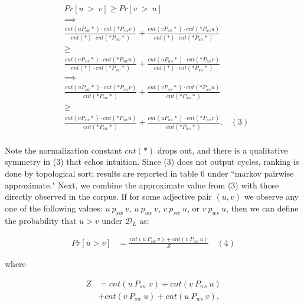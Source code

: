 \documentclass[11pt,letterpaper]{article}
\begin{document}
\begin{align*}
  &Pr[u \: > \: v] \ge Pr[v \: > \: u] \\
  &\implies \\
  &\frac{ cnt(u P_{sw} *) \cdot cnt(* P_{sw} v) }{ cnt(*) \cdot cnt(* P_{sw} *)} 
  + \frac{ cnt(v P_{ws} *) \cdot cnt(* P_{ws} u) }{ cnt(*) \cdot cnt(* P_{ws} *)} \\
  &\ge\\
  &\frac{ cnt(v P_{sw} *) \cdot cnt(* P_{sw} u) }{ cnt(*) \cdot cnt(* P_{sw} *)} 
  + \frac{ cnt(u P_{ws} *) \cdot cnt(* P_{ws} v) }{ cnt(*) \cdot cnt(* P_{ws} *)} \\
  &\implies\\
  &\frac{ cnt(u P_{sw} *) \cdot cnt(* P_{sw} v) }{ cnt(* P_{sw} *)} 
  + \frac{ cnt(v P_{ws} *) \cdot cnt(* P_{ws} u) }{ cnt(* P_{ws} *)} \\
  &\ge\\
  &\frac{ cnt(v P_{sw} *) \cdot cnt(* P_{sw} u) }{ cnt(* P_{sw} *)} 
  + \frac{ cnt(u P_{ws} *) \cdot cnt(* P_{ws} v) }{ cnt(* P_{ws} *)}. \quad (3) \\
\end{align*}

Note the normalization constant $cnt(*)$ drops out, and there is a qualitative symmetry in (3) that echos intuition. Since (3) does not output cycles, ranking is done by topological sort; results are reported in table 6 under ``markov pairwise approximate."  Next, we combine the approximate value from (3) with those directly observed in the corpus. If for some adjective pair $(u,v)$ we observe any one of the following values: $u \: p_{sw} \: v$, $u \: p_{ws} \: v$, $v \: p_{sw} \: u$, or $v \: p_{ws} \: u$, then we can define the probability that $u > v$ under $\mathcal{D}_L$ as:

\begin{align*}
Pr[u > v] &= \frac{cnt(u \: P_{sw} \: v) + cnt(v \: P_{ws} \: u)}{Z} \quad (4)
\end{align*}

where 

\begin{align*}
Z &= cnt(u \: P_{sw} \: v) + cnt(v \: P_{ws} \: u)\\
  &+ cnt(v \: P_{sw} \: u) + cnt(u \: P_{ws} \: v),
\end{align*}
\end{document}
